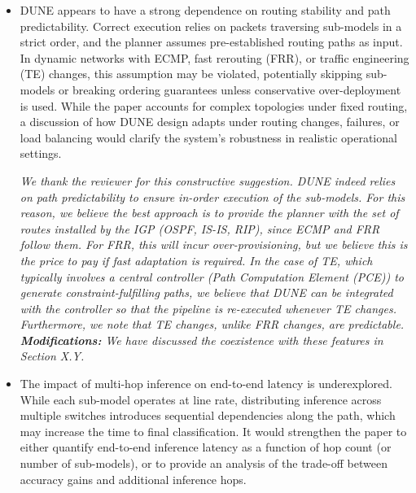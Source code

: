 \documentclass[10pt,compsoc,onecolumn,a4paper]{IEEEtran}
\begin{document}

\begin{itemize}

\vspace*{6pt}
\item[1.1] DUNE appears to have a strong dependence on routing stability and path predictability. Correct execution relies on packets traversing sub-models in a strict order, and the planner assumes pre-established routing paths as input. In dynamic networks with ECMP, fast rerouting (FRR), or traffic engineering (TE) changes, this assumption may be violated, potentially skipping sub-models or breaking ordering guarantees unless conservative over-deployment is used. While the paper accounts for complex topologies under fixed routing, a discussion of how DUNE design adapts under routing changes, failures, or load balancing would clarify the system’s robustness in realistic operational settings.

\vspace*{4pt}
{\it  We thank the reviewer for this constructive suggestion.
DUNE indeed relies on path predictability to ensure in-order execution of the sub-models.
For this reason, we believe the best approach is to provide the planner with the set of routes installed by the IGP (OSPF, IS-IS, RIP), since ECMP and FRR follow them.
For FRR, this will incur over-provisioning, but we believe this is the price to pay if fast adaptation is required.
In the case of TE, which typically involves a central controller (Path Computation Element (PCE)) to generate constraint-fulfilling paths, we believe that DUNE can be integrated with the controller so that the pipeline is re-executed whenever TE changes.
Furthermore, we note that TE changes, unlike FRR changes, are predictable.
\textbf{Modifications:} We have discussed the coexistence with these features in Section X.Y.

}

\vspace*{6pt}
\item[1.2] The impact of multi-hop inference on end-to-end latency is underexplored. While each sub-model operates at line rate, distributing inference across multiple switches introduces sequential dependencies along the path, which may increase the time to final classification. It would strengthen the paper to either quantify end-to-end inference latency as a function of hop count (or number of sub-models), or to provide an analysis of the trade-off between accuracy gains and additional inference hops.


\end{itemize}
\end{document}
